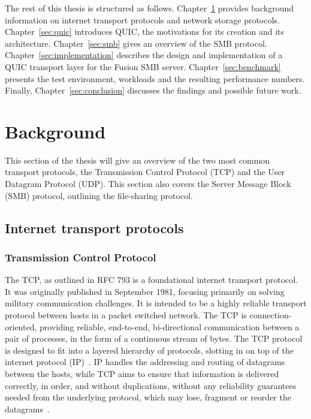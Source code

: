 \documentclass[english, 12pt, a4paper, elec, utf8, a-2b, online]{aaltothesis}
\begin{document}
The rest of this thesis is structured as follows. Chapter~\ref{sec:background} provides
background information on internet transport protocols and network storage protocols. Chapter~\ref{sec:quic} introduces
QUIC, the motivations for its creation and its architecture. Chapter~\ref{sec:smb} gives
an overview of the SMB protocol. Chapter~\ref{sec:implementation} describes the design
and implementation of a QUIC transport layer for the Fusion SMB server. Chapter~\ref{sec:benchmark}
presents the test environment, workloads and the resulting performance numbers. Finally, Chapter~\ref{sec:conclusion}
discusses the findings and possible future work.
\clearpage

\section{Background}
\label{sec:background}
This section of the thesis will give an overview of the two most common transport
protocols, the Transmission Control Protocol (TCP) and the User Datagram Protocol (UDP).
This section also covers the Server Message Block (SMB) protocol, outlining the
file-sharing protocol.
\subsection{Internet transport protocols}
\subsubsection{Transmission Control Protocol}
The TCP, as outlined in RFC
793 is a foundational internet transport protocol. It was
originally published in September 1981, focusing primarily on solving military
communication challenges. It is intended to be a highly reliable transport
protocol between hosts in a packet switched network. The TCP is connection-oriented,
providing reliable, end-to-end, bi-directional communication between a pair of processes, in the
form of a continuous stream of bytes. The TCP protocol is designed to fit into
a layered hierarchy of protocols, slotting
in on top of the internet protocol (IP)~\cite{rfc791}. IP handles the addressing
and routing of datagrams between the hosts, while TCP aims to ensure that
information is delivered correctly, in order, and without duplications, without
any reliability guarantees needed from the underlying protocol, which may lose,
fragment or reorder the datagrams~\cite{rfc793}.
\end{document}
